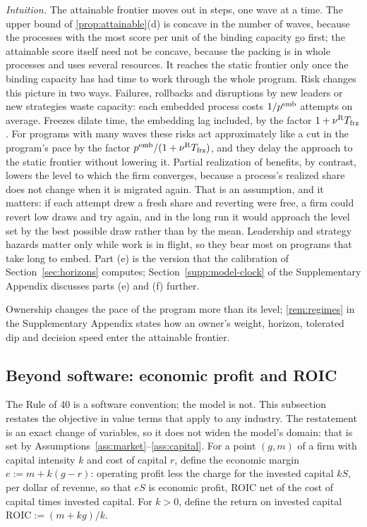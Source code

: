 \noindent\emph{Intuition.} The attainable frontier moves out in steps, one wave at a time. The upper bound of \autoref{prop:attainable}(d) is concave in the number of waves, because the processes with the most score per unit of the binding capacity go first; the attainable score itself need not be concave, because the packing is in whole processes and uses several resources. It reaches the static frontier only once the binding capacity has had time to work through the whole program. Risk changes this picture in two ways. Failures, rollbacks and disruptions by new leaders or new strategies waste capacity: each embedded process costs $1/p^{\rm emb}$ attempts on average. Freezes dilate time, the embedding lag included, by the factor $1+\nu^{\rm R}T_{\rm frz}$. For programs with many waves these risks act approximately like a cut in the program's pace by the factor $p^{\rm emb}/(1+\nu^{\rm R}T_{\rm frz})$, and they delay the approach to the static frontier without lowering it. Partial realization of benefits, by contrast, lowers the level to which the firm converges, because a process's realized share does not change when it is migrated again. That is an assumption, and it matters: if each attempt drew a fresh share and reverting were free, a firm could revert low draws and try again, and in the long run it would approach the level set by the best possible draw rather than by the mean. Leadership and strategy hazards matter only while work is in flight, so they bear most on programs that take long to embed. Part (e) is the version that the calibration of Section~\ref{sec:horizons} computes; Section~\ref{supp:model-clock} of the Supplementary Appendix discusses parts (e) and (f) further.

Ownership changes the pace of the program more than its level; \autoref{rem:regimes} in the Supplementary Appendix states how an owner's weight, horizon, tolerated dip and decision speed enter the attainable frontier.

\subsection{Beyond software: economic profit and ROIC}\label{sec:model-general}

The Rule of 40 is a software convention; the model is not. This subsection restates the objective in value terms that apply to any industry. The restatement is an exact change of variables, so it does not widen the model's domain: that is set by Assumptions~\ref{ass:market}--\ref{ass:capital}. For a point $(g,m)$ of a firm with capital intensity $k$ and cost of capital $r$, define the economic margin $e:=m+k(g-r)$: operating profit less the charge for the invested capital $kS$, per dollar of revenue, so that $eS$ is economic profit, ROIC net of the cost of capital times invested capital. For $k>0$, define the return on invested capital $\mathrm{ROIC}:=(m+kg)/k$.

